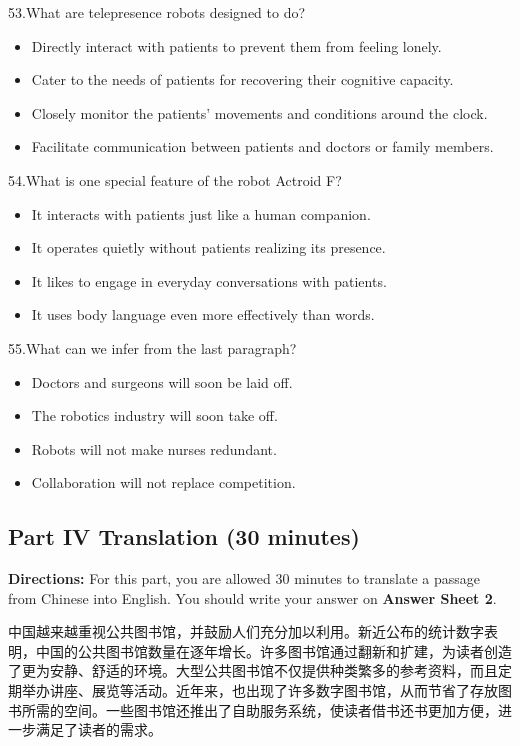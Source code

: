 \documentclass[UTF8,11pt]{ctexart}
\begin{document}
53.What are telepresence robots designed to do?


\begin{itemize}[leftmargin=2em,itemsep=.2em,topsep=.4em]\item[A.] Directly interact with patients to prevent them from feeling lonely.
\item[B.] Cater to the needs of patients for recovering their cognitive capacity.
\item[C.] Closely monitor the patients' movements and conditions around the clock.
\item[D.] Facilitate communication between patients and doctors or family members.
\end{itemize}

54.What is one special feature of the robot Actroid F?


\begin{itemize}[leftmargin=2em,itemsep=.2em,topsep=.4em]\item[A.] It interacts with patients just like a human companion.
\item[B.] It operates quietly without patients realizing its presence.
\item[C.] It likes to engage in everyday conversations with patients.
\item[D.] It uses body language even more effectively than words.
\end{itemize}

55.What can we infer from the last paragraph?


\begin{itemize}[leftmargin=2em,itemsep=.2em,topsep=.4em]\item[A.] Doctors and surgeons will soon be laid off.
\item[B.] The robotics industry will soon take off.
\item[C.] Robots will not make nurses redundant.
\item[D.] Collaboration will not replace competition.
\end{itemize}

\subsection*{\textbf{Part IV} \textbf{Translation} \textbf{(30 minutes)}}


\textbf{Directions:} For this part, you are allowed 30 minutes to translate a passage from Chinese into English. You should write your answer on\textbf{ Answer Sheet 2}.


中国越来越重视公共图书馆，并鼓励人们充分加以利用。新近公布的统计数字表明，中国的公共图书馆数量在逐年增长。许多图书馆通过翻新和扩建，为读者创造了更为安静、舒适的环境。大型公共图书馆不仅提供种类繁多的参考资料，而且定期举办讲座、展览等活动。近年来，也出现了许多数字图书馆，从而节省了存放图书所需的空间。一些图书馆还推出了自助服务系统，使读者借书还书更加方便，进一步满足了读者的需求。
\end{document}
